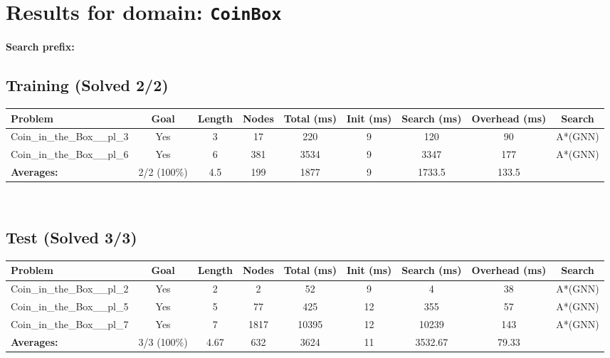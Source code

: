 \documentclass{article}
\begin{document}
\section*{Results for domain: \texttt{CoinBox}}
\textbf{Search prefix:} 
\\[0.5cm]
\subsection*{Training (Solved 2/2)}
\begin{tabular}{lcccccccc}
\toprule
Problem & Goal & Length & Nodes & Total (ms) & Init (ms) & Search (ms) & Overhead (ms) & Search \\
\midrule
Coin\_in\_the\_Box\_\_pl\_3 & Yes & 3 & 17 & 220 & 9 & 120 & 90 & A*(GNN) \\
Coin\_in\_the\_Box\_\_pl\_6 & Yes & 6 & 381 & 3534 & 9 & 3347 & 177 & A*(GNN) \\
\textbf{Averages:} & 2/2 (100\%) & 4.5 & 199 & 1877 & 9 & 1733.5 & 133.5 & \\
\bottomrule
\end{tabular}
\\[0.7cm]
\subsection*{Test (Solved 3/3)}
\begin{tabular}{lcccccccc}
\toprule
Problem & Goal & Length & Nodes & Total (ms) & Init (ms) & Search (ms) & Overhead (ms) & Search \\
\midrule
Coin\_in\_the\_Box\_\_pl\_2 & Yes & 2 & 2 & 52 & 9 & 4 & 38 & A*(GNN) \\
Coin\_in\_the\_Box\_\_pl\_5 & Yes & 5 & 77 & 425 & 12 & 355 & 57 & A*(GNN) \\
Coin\_in\_the\_Box\_\_pl\_7 & Yes & 7 & 1817 & 10395 & 12 & 10239 & 143 & A*(GNN) \\
\textbf{Averages:} & 3/3 (100\%) & 4.67 & 632 & 3624 & 11 & 3532.67 & 79.33 & \\
\bottomrule
\end{tabular}
\\[0.7cm]
\end{document}
